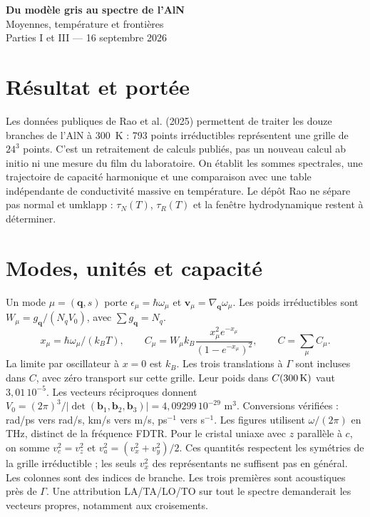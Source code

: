\documentclass[11pt,a4paper]{article}
\begin{document}
\begin{center}
{\Large\bfseries Du modèle gris au spectre de l'AlN}\\[4pt]
{\normalsize Moyennes, température et frontières}\\[2pt]
{\small Parties I et III --- 16 septembre 2026}
\end{center}
\section{Résultat et portée}
Les données publiques de Rao et al. (2025) permettent de traiter les douze branches de l'AlN à 300~K : 793 points irréductibles représentent une grille de $24^3$ points. C'est un retraitement de calculs publiés, pas un nouveau calcul ab initio ni une mesure du film du laboratoire.
On établit les sommes spectrales, une trajectoire de capacité harmonique et une comparaison avec une table indépendante de conductivité massive en température. Le dépôt Rao ne sépare pas normal et umklapp : $\tau_N(T)$, $\tau_R(T)$ et la fenêtre hydrodynamique restent à déterminer.
\section{Modes, unités et capacité}
Un mode $\mu=(\mathbf q,s)$ porte $\epsilon_\mu=\hbar\omega_\mu$ et $\mathbf v_\mu=\nabla_{\mathbf q}\omega_\mu$. Les poids irréductibles sont $W_\mu=g_{\mathbf q}/(N_qV_0)$, avec $\sum g_{\mathbf q}=N_q$.
\[x_\mu=\hbar\omega_\mu/(k_BT),\qquad C_\mu=W_\mu k_B\frac{x_\mu^2e^{-x_\mu}}{(1-e^{-x_\mu})^2},\qquad C=\sum_\mu C_\mu.\]
La limite par oscillateur à $x=0$ est $k_B$. Les trois translations à $\Gamma$ sont incluses dans $C$, avec zéro transport sur cette grille. Leur poids dans $C(300\,{\rm K})$ vaut $3{,}01\,10^{-5}$.
Les vecteurs réciproques donnent $V_0=(2\pi)^3/|\det(\mathbf b_1,\mathbf b_2,\mathbf b_3)|=4{,}09299\,10^{-29}$ m$^3$. Conversions vérifiées : rad/ps vers rad/s, km/s vers m/s, ps$^{-1}$ vers s$^{-1}$. Les figures utilisent $\omega/(2\pi)$ en THz, distinct de la fréquence FDTR.
Pour le cristal uniaxe avec $z$ parallèle à $c$, on somme $v_c^2=v_z^2$ et $v_a^2=(v_x^2+v_y^2)/2$. Ces quantités respectent les symétries de la grille irréductible ; les seuls $v_x^2$ des représentants ne suffisent pas en général.
Les colonnes sont des indices de branche. Les trois premières sont acoustiques près de $\Gamma$. Une attribution LA/TA/LO/TO sur tout le spectre demanderait les vecteurs propres, notamment aux croisements.
\end{document}
